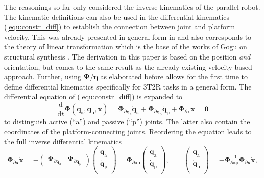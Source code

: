 \documentclass[robotics,article,submit,moreauthors,pdftex]{Definitions/mdpi}
\newcommand{\bm}[1]{\boldsymbol{#1}}
\begin{document}
The reasonings so far only considered the inverse kinematics of the parallel robot.
The kinematic definitions can also be used in the differential kinematics (\ref{equ:constr_diff}) to establish the connection between joint and platform velocity.
This was already presented in general form in \cite{Merlet2006} and also corresponds to the theory of linear transformation which is the base of the works of Gogu on structural synthesis \cite{Gogu2008}.
The derivation in this paper is based on the position \emph{and} orientation, but comes to the same result as the already-existing velocity-based approach.
Further, using $\bm{\Psi}$/$\bm{\eta}$ as elaborated before allows for the first time to define differential kinematics specifically for 3T2R tasks in a general form.
The differential equation of (\ref{equ:constr_diff}) is expanded to 
\begin{equation}
\frac{\mathrm{d}}{\mathrm{d}t} \bm{\Phi}(\bm{q}_{\mathrm{a}}, \bm{q}_{\mathrm{p}},\bm{x})
=
\bm{\Phi}_{\partial\bm{q}_{\mathrm{a}}} \dot{\bm{q}}_{\mathrm{a}} + \bm{\Phi}_{\partial\bm{q}_{\mathrm{p}}} \dot{\bm{q}}_{\mathrm{p}} + \bm{\Phi}_{\partial\bm{x}} \dot{\bm{x}} 
=
\bm{0}
\label{equ:constr_diff_qap}
\end{equation}
to distinguish active (``a'') and passive (``p'') joints.
The latter also contain the coordinates of the platform-connecting joints.
Reordering the equation leads to the full inverse differential kinematics
\begin{equation}
\bm{\Phi}_{\partial\bm{x}} \dot{\bm{x}}
=
- 
\begin{pmatrix} \bm{\Phi}_{\partial\bm{q}_{\mathrm{a}}} & \bm{\Phi}_{\partial\bm{q}_{\mathrm{p}}}\end{pmatrix}
\begin{pmatrix}
\dot{\bm{q}}_{\mathrm{a}} \\
\dot{\bm{q}}_{\mathrm{p}} \\
\end{pmatrix}
=
\bm{\Phi}_{\partial\mathrm{ap}}
\begin{pmatrix}
\dot{\bm{q}}_{\mathrm{a}} \\
\dot{\bm{q}}_{\mathrm{p}} \\
\end{pmatrix},
\quad\quad
\begin{pmatrix}
\dot{\bm{q}}_{\mathrm{a}} \\
\dot{\bm{q}}_{\mathrm{p}} \\
\end{pmatrix}
=
-\bm{\Phi}_{\partial\mathrm{ap}}^{-1} \bm{\Phi}_{\partial\bm{x}}
\dot{\bm{x}},
\label{equ:full_diff_ik}
\end{equation}
\end{document}

